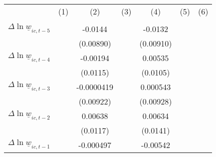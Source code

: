 {
\def\sym#1{\ifmmode^{#1}\else\(^{#1}\)\fi}
\begin{tabular}{l*{6}{c}}
\hline\hline
          &&&&&&\\
          &&&&&&\\
\hline
$\Delta \ln \underline{w}_{ic,t-5}$&                  &  -0.0144         &                  &  -0.0132         &                  &                  \\
          &                  &(0.00890)         &                  &(0.00910)         &                  &                  \\
[1em]
$\Delta \ln \underline{w}_{ic,t-4}$&                  & -0.00194         &                  &  0.00535         &                  &                  \\
          &                  & (0.0115)         &                  & (0.0105)         &                  &                  \\
[1em]
$\Delta \ln \underline{w}_{ic,t-3}$&                  &-0.0000419         &                  & 0.000543         &                  &                  \\
          &                  &(0.00922)         &                  &(0.00928)         &                  &                  \\
[1em]
$\Delta \ln \underline{w}_{ic,t-2}$&                  &  0.00638         &                  &  0.00634         &                  &                  \\
          &                  & (0.0117)         &                  & (0.0141)         &                  &                  \\
[1em]
$\Delta \ln \underline{w}_{ic,t-1}$&                  &-0.000497         &                  & -0.00542         &                  &                  \\

\end{tabular}}
